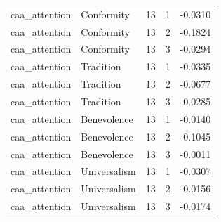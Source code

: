 \begin{tabular}{llrrr}
caa\_attention & Conformity & 13 & 1 & -0.0310 \\
caa\_attention & Conformity & 13 & 2 & -0.1824 \\
caa\_attention & Conformity & 13 & 3 & -0.0294 \\
caa\_attention & Tradition & 13 & 1 & -0.0335 \\
caa\_attention & Tradition & 13 & 2 & -0.0677 \\
caa\_attention & Tradition & 13 & 3 & -0.0285 \\
caa\_attention & Benevolence & 13 & 1 & -0.0140 \\
caa\_attention & Benevolence & 13 & 2 & -0.1045 \\
caa\_attention & Benevolence & 13 & 3 & -0.0011 \\
caa\_attention & Universalism & 13 & 1 & -0.0307 \\
caa\_attention & Universalism & 13 & 2 & -0.0156 \\
caa\_attention & Universalism & 13 & 3 & -0.0174 \\
\bottomrule
\end{tabular}
